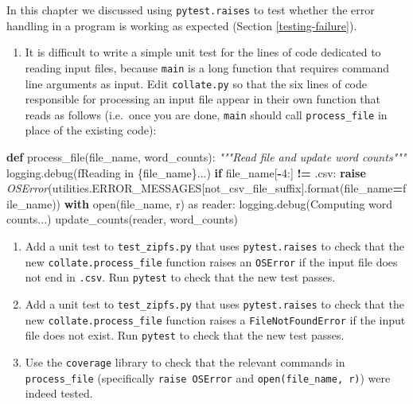 \documentclass[
]{krantz}
\makeatletter
\newenvironment{Shaded}{\begin{snugshade}}{\end{snugshade}}
\newcommand{\BuiltInTok}[1]{#1}
\newcommand{\CommentTok}[1]{\textcolor[rgb]{0.56,0.35,0.01}{\textit{#1}}}
\newcommand{\ControlFlowTok}[1]{\textcolor[rgb]{0.13,0.29,0.53}{\textbf{#1}}}
\newcommand{\DecValTok}[1]{\textcolor[rgb]{0.00,0.00,0.81}{#1}}
\newcommand{\ImportTok}[1]{#1}
\newcommand{\KeywordTok}[1]{\textcolor[rgb]{0.13,0.29,0.53}{\textbf{#1}}}
\newcommand{\NormalTok}[1]{#1}
\newcommand{\OperatorTok}[1]{\textcolor[rgb]{0.81,0.36,0.00}{\textbf{#1}}}
\newcommand{\PreprocessorTok}[1]{\textcolor[rgb]{0.56,0.35,0.01}{\textit{#1}}}
\newcommand{\SpecialCharTok}[1]{\textcolor[rgb]{0.00,0.00,0.00}{#1}}
\newcommand{\SpecialStringTok}[1]{\textcolor[rgb]{0.31,0.60,0.02}{#1}}
\newcommand{\StringTok}[1]{\textcolor[rgb]{0.31,0.60,0.02}{#1}}
\providecommand{\tightlist}{%
  \setlength{\itemsep}{0pt}\setlength{\parskip}{0pt}}
\newenvironment{kframe}{%
\medskip{}
\setlength{\fboxsep}{.8em}
 \def\at@end@of@kframe{}%
 \ifinner\ifhmode%
  \def\at@end@of@kframe{\end{minipage}}%
  \begin{minipage}{\columnwidth}%
 \fi\fi%
 \def\FrameCommand##1{\hskip\@totalleftmargin \hskip-\fboxsep
 \colorbox{shadecolor}{##1}\hskip-\fboxsep
     \hskip-\linewidth \hskip-\@totalleftmargin \hskip\columnwidth}%
 \MakeFramed {\advance\hsize-\width
   \@totalleftmargin\z@ \linewidth\hsize
   \@setminipage}}%
 {\par\unskip\endMakeFramed%
 \at@end@of@kframe}
\renewenvironment{Shaded}{\begin{kframe}}{\end{kframe}}
\makeatother
\begin{document}
In this chapter we discussed using \texttt{pytest.raises}
to test whether the error handling in a program is working as expected (Section \ref{testing-failure}).

\begin{enumerate}
\def\labelenumi{\arabic{enumi}.}
\tightlist
\item
  It is difficult to write a simple unit test for the lines of code dedicated
  to reading input files, because \texttt{main} is a long function that requires
  command line arguments as input. Edit \texttt{collate.py} so that the six lines of
  code responsible for processing an input file appear in their own function
  that reads as follows (i.e.~once you are done, \texttt{main} should call
  \texttt{process\_file} in place of the existing code):
\end{enumerate}

\begin{Shaded}
\begin{Highlighting}[]
\KeywordTok{def}\NormalTok{ process\_file(file\_name, word\_counts):}
    \CommentTok{"""Read file and update word counts"""}
\NormalTok{    logging.debug(}\SpecialStringTok{f\textquotesingle{}Reading in }\SpecialCharTok{\{}\NormalTok{file\_name}\SpecialCharTok{\}}\SpecialStringTok{...\textquotesingle{}}\NormalTok{)}
    \ControlFlowTok{if}\NormalTok{ file\_name[}\OperatorTok{{-}}\DecValTok{4}\NormalTok{:] }\OperatorTok{!=} \StringTok{\textquotesingle{}.csv\textquotesingle{}}\NormalTok{:}
        \ControlFlowTok{raise} \PreprocessorTok{OSError}\NormalTok{(utilities.ERROR\_MESSAGES[}\StringTok{\textquotesingle{}not\_csv\_file\_suffix\textquotesingle{}}\NormalTok{].}\BuiltInTok{format}\NormalTok{(file\_name}\OperatorTok{=}\NormalTok{file\_name))}
    \ControlFlowTok{with} \BuiltInTok{open}\NormalTok{(file\_name, }\StringTok{\textquotesingle{}r\textquotesingle{}}\NormalTok{) }\ImportTok{as}\NormalTok{ reader:}
\NormalTok{        logging.debug(}\StringTok{\textquotesingle{}Computing word counts...\textquotesingle{}}\NormalTok{)}
\NormalTok{        update\_counts(reader, word\_counts)}
\end{Highlighting}
\end{Shaded}

\begin{enumerate}
\def\labelenumi{\arabic{enumi}.}
\setcounter{enumi}{1}
\item
  Add a unit test to \texttt{test\_zipfs.py} that uses \texttt{pytest.raises} to check that
  the new \texttt{collate.process\_file} function raises an \texttt{OSError} if the input
  file does not end in \texttt{.csv}. Run \texttt{pytest} to check that the new test
  passes.
\item
  Add a unit test to \texttt{test\_zipfs.py} that uses \texttt{pytest.raises} to check that
  the new \texttt{collate.process\_file} function raises a \texttt{FileNotFoundError} if the
  input file does not exist. Run \texttt{pytest} to check that the new test passes.
\item
  Use the \texttt{coverage} library to check that the relevant commands in
  \texttt{process\_file} (specifically \texttt{raise\ OSError} and \texttt{open(file\_name,\ \textquotesingle{}r\textquotesingle{})})
  were indeed tested.
\end{enumerate}
\end{document}

